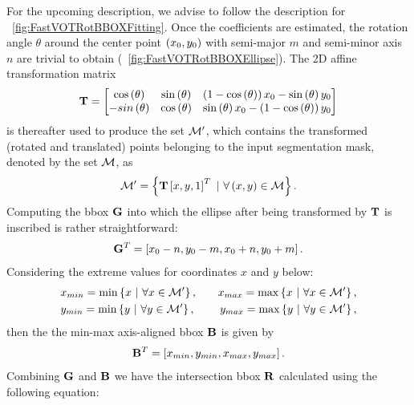 For the upcoming description, we advise to follow the description for \figstr{}~\ref{fig:FastVOTRotBBOXFitting}. Once the coefficients are estimated, the rotation angle $\theta$ around the center point $\left( {x_0, y_0} \right)$ with semi-major $m$ and semi-minor axis $n$ are trivial to obtain (\figstr{}~\ref{fig:FastVOTRotBBOXEllipse}). The 2D affine transformation matrix
\begin{equation}
    \mathbf{T} =
    \begin{bmatrix}
        {\cos} \left( \theta \right) &
        {\sin} \left( \theta \right) &
        \left( {1 - {\cos} \left( \theta \right)} \right)x_0 - {\sin} \left( \theta \right) y_0 \\
        -{sin} \left( \theta \right) &
        {\cos} \left( \theta \right) &
        {\sin} \left( \theta \right) x_0 - \left( {1 - {\cos} \left( \theta \right)} \right) y_0
    \end{bmatrix}
\end{equation}
is thereafter used to produce the set $\mathcal{M'}$, which contains the transformed (rotated and translated) points belonging to the input segmentation mask, denoted by the set $\mathcal{M}$, as
\begin{equation}
    \mathcal{M'} =
    \left\{ {
        \mathbf{T}
        \left[ {x, y, 1} \right]^T
        \ | \
        \forall \left( {x, y} \right) \in \mathcal{M}
    } \right\}.
\end{equation}
Computing the \gls{bbox} $\mathbf{G}$ into which the ellipse after being transformed by $\mathbf{T}$ is inscribed is rather straightforward:
\begin{equation}
    {\mathbf{G}}^T = \left[ {x_0 - n, y_0 - m, x_0 + n, y_0 + m} \right].
\end{equation}
Considering the extreme values for coordinates $x$ and $y$ below:
\begin{equation}
    \begin{aligned}
         & x_{min} = \min \left\{ {x\ |\ \forall x \in \mathcal{M'}} \right\},
        \quad
         & x_{max} = \max \left\{ {x\ |\ \forall x \in \mathcal{M'}} \right\}, \\
         & y_{min} = \min \left\{ {y\ |\ \forall y \in \mathcal{M'}} \right\},
        \quad
         & y_{max} = \max \left\{ {y\ |\ \forall y \in \mathcal{M'}} \right\},
    \end{aligned}
\end{equation}
then the the min-max axis-aligned \gls{bbox} $\mathbf{B}$ is given by
\begin{equation}
    {\mathbf{B}}^T = \left[ {x_{min}, y_{min}, x_{max}, y_{max}} \right].
\end{equation}
Combining $\mathbf{G}$ and $\mathbf{B}$ we have the intersection \gls{bbox} $\mathbf{R}$ calculated using the following equation:

